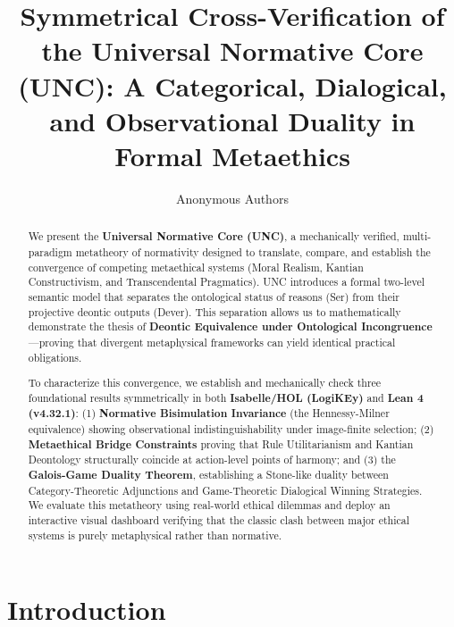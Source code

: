 \documentclass[runningheads]{llncs}
\begin{document}
\title{Symmetrical Cross-Verification of the Universal Normative Core (UNC): A Categorical, Dialogical, and Observational Duality in Formal Metaethics}

\author{Anonymous Authors}

\maketitle

\begin{abstract}
We present the \textbf{Universal Normative Core (UNC)}, a mechanically verified, multi-paradigm metatheory of normativity designed to translate, compare, and establish the convergence of competing metaethical systems (Moral Realism, Kantian Constructivism, and Transcendental Pragmatics). UNC introduces a formal two-level semantic model that separates the ontological status of reasons (Ser) from their projective deontic outputs (Dever). This separation allows us to mathematically demonstrate the thesis of \textbf{Deontic Equivalence under Ontological Incongruence}---proving that divergent metaphysical frameworks can yield identical practical obligations. 

To characterize this convergence, we establish and mechanically check three foundational results symmetrically in both \textbf{Isabelle/HOL (LogiKEy)} and \textbf{Lean 4 (v4.32.1)}: (1) \textbf{Normative Bisimulation Invariance} (the Hennessy-Milner equivalence) showing observational indistinguishability under image-finite selection; (2) \textbf{Metaethical Bridge Constraints} proving that Rule Utilitarianism and Kantian Deontology structurally coincide at action-level points of harmony; and (3) the \textbf{Galois-Game Duality Theorem}, establishing a Stone-like duality between Category-Theoretic Adjunctions and Game-Theoretic Dialogical Winning Strategies. We evaluate this metatheory using real-world ethical dilemmas and deploy an interactive visual dashboard verifying that the classic clash between major ethical systems is purely metaphysical rather than normative.

\end{abstract}

\section{Introduction}
\end{document}
